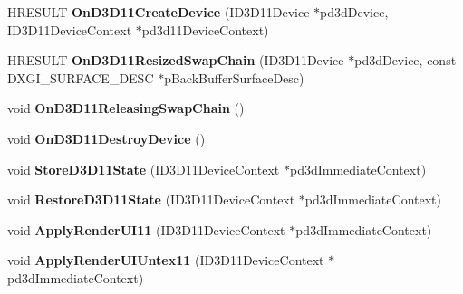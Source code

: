 \begin{DoxyCompactItemize}
\item 
\hypertarget{class_c_d_x_u_t_dialog_resource_manager_a0302659fce4f42e4c8f54972d2e3baa2}{H\+R\+E\+S\+U\+L\+T {\bfseries On\+D3\+D11\+Create\+Device} (I\+D3\+D11\+Device $\ast$pd3d\+Device, I\+D3\+D11\+Device\+Context $\ast$pd3d11\+Device\+Context)}\label{class_c_d_x_u_t_dialog_resource_manager_a0302659fce4f42e4c8f54972d2e3baa2}

\item 
\hypertarget{class_c_d_x_u_t_dialog_resource_manager_adae0b1f514842a400f450a30264c5036}{H\+R\+E\+S\+U\+L\+T {\bfseries On\+D3\+D11\+Resized\+Swap\+Chain} (I\+D3\+D11\+Device $\ast$pd3d\+Device, const D\+X\+G\+I\+\_\+\+S\+U\+R\+F\+A\+C\+E\+\_\+\+D\+E\+S\+C $\ast$p\+Back\+Buffer\+Surface\+Desc)}\label{class_c_d_x_u_t_dialog_resource_manager_adae0b1f514842a400f450a30264c5036}

\item 
\hypertarget{class_c_d_x_u_t_dialog_resource_manager_a27b477db6e664cf79e516f4feff92a41}{void {\bfseries On\+D3\+D11\+Releasing\+Swap\+Chain} ()}\label{class_c_d_x_u_t_dialog_resource_manager_a27b477db6e664cf79e516f4feff92a41}

\item 
\hypertarget{class_c_d_x_u_t_dialog_resource_manager_a5019eed2a64650f1fec018aa08109dd7}{void {\bfseries On\+D3\+D11\+Destroy\+Device} ()}\label{class_c_d_x_u_t_dialog_resource_manager_a5019eed2a64650f1fec018aa08109dd7}

\item 
\hypertarget{class_c_d_x_u_t_dialog_resource_manager_a3b50512ca9130dc84dfb37483927b6fe}{void {\bfseries Store\+D3\+D11\+State} (I\+D3\+D11\+Device\+Context $\ast$pd3d\+Immediate\+Context)}\label{class_c_d_x_u_t_dialog_resource_manager_a3b50512ca9130dc84dfb37483927b6fe}

\item 
\hypertarget{class_c_d_x_u_t_dialog_resource_manager_adc29b7669678c0241a59854a9465e4ec}{void {\bfseries Restore\+D3\+D11\+State} (I\+D3\+D11\+Device\+Context $\ast$pd3d\+Immediate\+Context)}\label{class_c_d_x_u_t_dialog_resource_manager_adc29b7669678c0241a59854a9465e4ec}

\item 
\hypertarget{class_c_d_x_u_t_dialog_resource_manager_a3bc0b29ac57e3f7203e5e2cabe5f573f}{void {\bfseries Apply\+Render\+U\+I11} (I\+D3\+D11\+Device\+Context $\ast$pd3d\+Immediate\+Context)}\label{class_c_d_x_u_t_dialog_resource_manager_a3bc0b29ac57e3f7203e5e2cabe5f573f}

\item 
\hypertarget{class_c_d_x_u_t_dialog_resource_manager_a6239637906a2fec314de262921f38685}{void {\bfseries Apply\+Render\+U\+I\+Untex11} (I\+D3\+D11\+Device\+Context $\ast$pd3d\+Immediate\+Context)}\label{class_c_d_x_u_t_dialog_resource_manager_a6239637906a2fec314de262921f38685}


\end{DoxyCompactItemize}
